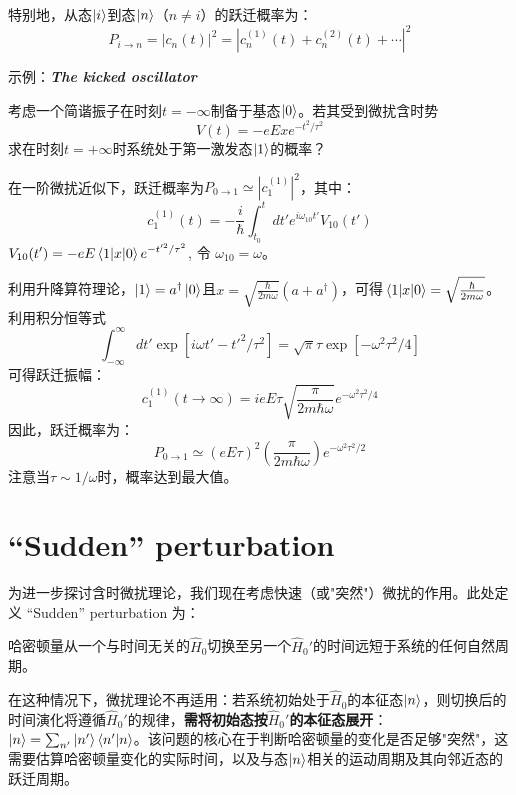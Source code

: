 特别地，从态$\ket{i}$到态$\ket{n}$（$n\neq i$）的跃迁概率为：
\begin{equation}
	P_{i\to n}=|c_n(t)|^2=|c_n^{(1)}(t)+c_n^{(2)}(t)+\cdots|^2
\end{equation}

示例：\textit{\textbf{The kicked oscillator}}

考虑一个简谐振子在时刻$t=-\infty$制备于基态$\ket{0}$。若其受到微扰含时势
\[V(t)=-eE x e^{-t^2/\tau^2}\]
求在时刻$t=+\infty$时系统处于第一激发态$\ket{1}$的概率？

在一阶微扰近似下，跃迁概率为$P_{0\to1}\simeq|c_1^{(1)}|^2$，其中：
\begin{equation}
	c_1^{(1)}(t)=-\frac{i}{\hbar}\int_{t_0}^t dt' e^{i\omega_{10}t'} V_{10}(t')
\end{equation}
$\displaystyle V_{10}(t')=-eE\matrixel{1}{x}{0}e^{-t'^2/\tau^2}$, 令 $\omega_{10}=\omega$。

利用升降算符理论，$\ket{1}=a^\dagger\ket{0}$且$x=\sqrt{\frac{\hbar}{2m\omega}}(a+a^\dagger)$，可得$\matrixel{1}{x}{0}=\sqrt{\frac{\hbar}{2m\omega}}$。利用积分恒等式
\[\int_{-\infty}^\infty dt' \exp\left[i\omega t'-t'^2/\tau^2\right]=\sqrt{\pi}\tau\exp\left[-\omega^2\tau^2/4\right]\]
可得跃迁振幅：
\begin{equation}
	c_1^{(1)}(t\to\infty)=ieE\tau\sqrt{\frac{\pi}{2m\hbar\omega}}e^{-\omega^2\tau^2/4}
\end{equation}
因此，跃迁概率为：
\begin{equation}
	P_{0\to1}\simeq(eE\tau)^2\left(\frac{\pi}{2m\hbar\omega}\right)e^{-\omega^2\tau^2/2}
\end{equation}
注意当$\tau\sim1/\omega$时，概率达到最大值。

\section{“Sudden” perturbation}
为进一步探讨含时微扰理论，我们现在考虑快速（或"突然"）微扰的作用。此处定义 “Sudden” perturbation 为：

哈密顿量从一个与时间无关的$\hat{H}_0$切换至另一个$\hat{H}_0'$的时间远短于系统的任何自然周期。

在这种情况下，微扰理论不再适用：若系统初始处于$\hat{H}_0$的本征态$\ket{n}$，则切换后的时间演化将遵循$\hat{H}_0'$的规律，\textbf{需将初始态按}$\hat{H}_0'$\textbf{的本征态展开}：$\ket{n}=\sum_{n'}\ket{n'}\braket{n'}{n}$。该问题的核心在于判断哈密顿量的变化是否足够"突然"，这需要估算哈密顿量变化的实际时间，以及与态$\ket{n}$相关的运动周期及其向邻近态的跃迁周期。

